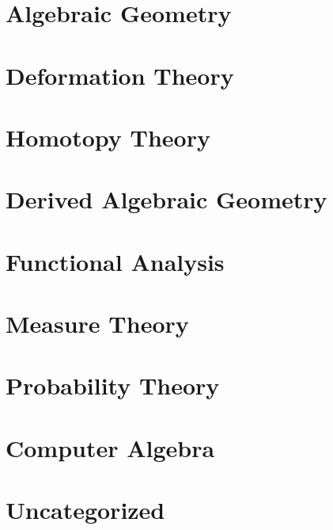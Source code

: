\documentclass{report}
\begin{document}
\chapter{Algebraic Geometry}
\renewcommand{\cat}{AG}








\chapter{Deformation Theory}
\renewcommand{\cat}{DT}


\chapter{Homotopy Theory}
\renewcommand{\cat}{HT}




\chapter{Derived Algebraic Geometry}
\renewcommand{\cat}{DAG}


\chapter{Functional Analysis}
\renewcommand{\cat}{FA}


\chapter{Measure Theory}
\renewcommand{\cat}{MT}


\chapter{Probability Theory}
\renewcommand{\cat}{PT}




\chapter{Computer Algebra}
\renewcommand{\cat}{CP}


\chapter{Uncategorized}
\renewcommand{\cat}{UN}

\end{document}
